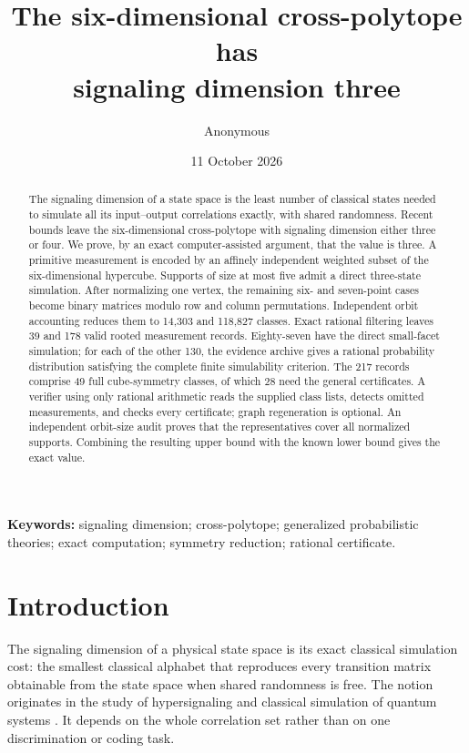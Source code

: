 \documentclass[11pt]{article}
\title{The six-dimensional cross-polytope has\protect\\
signaling dimension three}
\author{Anonymous}
\date{11 October 2026}
\begin{document}
\maketitle

\begin{abstract}
The signaling dimension of a state space is the least number of classical
states needed to simulate all its input--output correlations exactly, with
shared randomness. Recent bounds leave the six-dimensional cross-polytope
with signaling dimension either three or four. We prove, by an exact
computer-assisted argument, that the value is three. A primitive measurement
is encoded by an affinely independent weighted subset of the six-dimensional
hypercube. Supports of size at most five admit a direct three-state simulation.
After normalizing one vertex, the remaining six- and seven-point cases become
binary matrices modulo row and column permutations. Independent orbit
accounting reduces them to 14,303 and 118,827 classes. Exact rational filtering
leaves 39 and 178 valid rooted measurement records. Eighty-seven have the direct
small-facet simulation; for each of the other 130, the evidence archive gives
a rational probability distribution satisfying the complete finite
simulability criterion. The 217 records comprise 49 full cube-symmetry classes,
of which 28 need the general certificates. A verifier using only rational
arithmetic reads the supplied class lists, detects omitted measurements,
and checks every certificate; graph regeneration is optional.
An independent orbit-size audit proves that the representatives cover all
normalized supports. Combining the resulting upper bound with the known lower
bound gives the exact value.
\end{abstract}

\noindent\textbf{Keywords:} signaling dimension; cross-polytope; generalized
probabilistic theories; exact computation; symmetry reduction; rational
certificate.

\section{Introduction}

The signaling dimension of a physical state space is its exact classical
simulation cost: the smallest classical alphabet that reproduces every
transition matrix obtainable from the state space when shared randomness is
free. The notion originates in the study of hypersignaling and classical
simulation of quantum systems
\cite{NoHypersignaling,FrenkelWeiner,Frenkel,DallArnoTosiniBuscemi}.
It depends on the whole correlation set rather than on one discrimination or
coding task.
\end{document}
